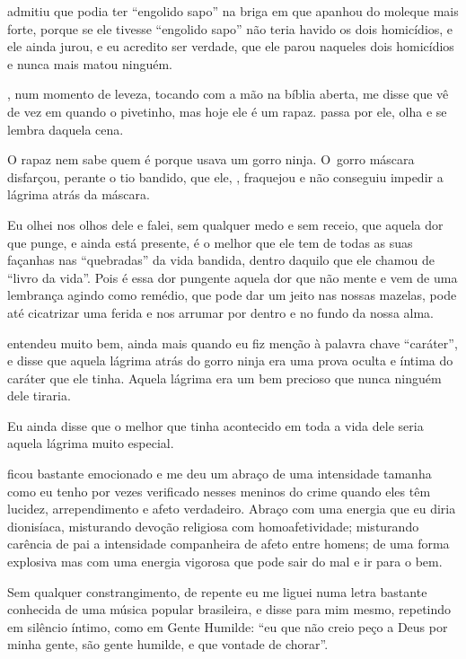  admitiu que podia ter ``engolido sapo'' na briga em que apanhou do
moleque mais forte, porque se ele tivesse ``engolido sapo'' não teria
havido os dois homicídios, e ele ainda jurou, e eu acredito ser verdade,
que ele parou naqueles dois homicídios e nunca mais matou ninguém.

, num momento de leveza, tocando com a mão na bíblia aberta, me disse
que vê de vez em quando o pivetinho, mas hoje ele é um rapaz.  passa
por ele, olha e se lembra daquela cena.

O rapaz nem sabe quem é  porque  usava um gorro ninja. O~gorro
máscara disfarçou, perante o tio bandido, que ele, , fraquejou e não
conseguiu impedir a lágrima atrás da máscara.

Eu olhei nos olhos dele e falei, sem qualquer medo e sem receio, que
aquela dor que punge, e ainda está presente, é o melhor que ele tem de
todas as suas façanhas nas ``quebradas'' da vida bandida, dentro daquilo
que ele chamou de ``livro da vida''. Pois é essa dor pungente aquela dor
que não mente e vem de uma lembrança agindo como remédio, que pode dar
um jeito nas nossas mazelas, pode até cicatrizar uma ferida e nos
arrumar por dentro e no fundo da nossa alma.

 entendeu muito bem, ainda mais quando eu fiz menção à palavra chave
``caráter'', e disse que aquela lágrima atrás do gorro ninja era uma
prova oculta e íntima do caráter que ele tinha. Aquela lágrima era um
bem precioso que nunca ninguém dele tiraria.

Eu ainda disse que o melhor que tinha acontecido em toda a vida dele
seria aquela lágrima muito especial.

 ficou bastante emocionado e me deu um abraço de uma intensidade
tamanha como eu tenho por vezes verificado nesses meninos do crime
quando eles têm lucidez, arrependimento e afeto verdadeiro. Abraço com
uma energia que eu diria dionisíaca, misturando devoção religiosa com
homoafetividade; misturando carência de pai a intensidade companheira de
afeto entre homens; de uma forma explosiva mas com uma energia vigorosa
que pode sair do mal e ir para o bem.

Sem qualquer constrangimento, de repente eu me liguei numa letra
bastante conhecida de uma música popular brasileira, e disse para mim
mesmo, repetindo em silêncio íntimo, como em Gente Humilde: ``eu que não
creio peço a Deus por minha gente, são gente humilde, e que vontade de
chorar''.

